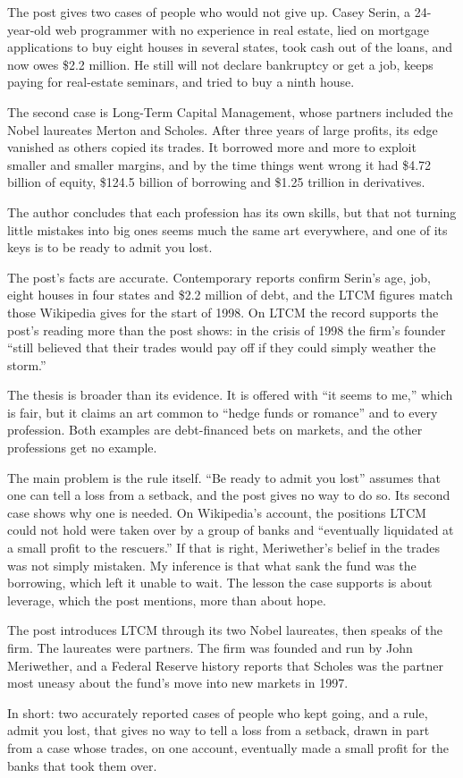 \begin{afterword}
\summaryhead

The post gives two cases of people who would not give up. Casey Serin, a 24-year-old web programmer with no experience in real estate, lied on mortgage applications to buy eight houses in several states, took cash out of the loans, and now owes \$2.2 million. He still will not declare bankruptcy or get a job, keeps paying for real-estate seminars, and tried to buy a ninth house.

The second case is Long-Term Capital Management, whose partners included the Nobel laureates Merton and Scholes. After three years of large profits, its edge vanished as others copied its trades. It borrowed more and more to exploit smaller and smaller margins, and by the time things went wrong it had \$4.72 billion of equity, \$124.5 billion of borrowing and \$1.25 trillion in derivatives.

The author concludes that each profession has its own skills, but that not turning little mistakes into big ones seems much the same art everywhere, and one of its keys is to be ready to admit you lost.

\responsehead

The post's facts are accurate. Contemporary reports confirm Serin's age, job, eight houses in four states and \$2.2 million of debt, and the LTCM figures match those Wikipedia gives for the start of 1998. On LTCM the record supports the post's reading more than the post shows: in the crisis of 1998 the firm's founder ``still believed that their trades would pay off if they could simply weather the storm.''

The thesis is broader than its evidence. It is offered with ``it seems to me,'' which is fair, but it claims an art common to ``hedge funds or romance'' and to every profession. Both examples are debt-financed bets on markets, and the other professions get no example.

The main problem is the rule itself. ``Be ready to admit you lost'' assumes that one can tell a loss from a setback, and the post gives no way to do so. Its second case shows why one is needed. On Wikipedia's account, the positions LTCM could not hold were taken over by a group of banks and ``eventually liquidated at a small profit to the rescuers.'' If that is right, Meriwether's belief in the trades was not simply mistaken. My inference is that what sank the fund was the borrowing, which left it unable to wait. The lesson the case supports is about leverage, which the post mentions, more than about hope.

The post introduces LTCM through its two Nobel laureates, then speaks of the firm. The laureates were partners. The firm was founded and run by John Meriwether, and a Federal Reserve history reports that Scholes was the partner most uneasy about the fund's move into new markets in 1997.

In short: two accurately reported cases of people who kept going, and a rule, admit you lost, that gives no way to tell a loss from a setback, drawn in part from a case whose trades, on one account, eventually made a small profit for the banks that took them over.
\end{afterword}
